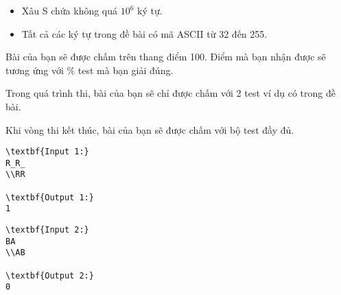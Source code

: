 \begin{itemize}
	\item     Xâu S chứa không quá $10^{6}$    ký tự.   
	\item     Tất cả các ký tự trong đề bài có mã ASCII từ 32 đến 255.   
\end{itemize}
Bài của bạn sẽ được chấm trên thang điểm 100. Điểm mà bạn nhận được sẽ tương ứng với \% test mà bạn giải đúng.  

   Trong quá trình thi, bài của bạn sẽ chỉ được chấm với 2 test ví dụ có trong đề bài.  

   Khi vòng thi kết thúc, bài của bạn sẽ được chấm với bộ test đầy đủ.
\begin{verbatim}
\textbf{Input 1:}
R_R_
\\RR

\textbf{Output 1:}
1
\end{verbatim}
\begin{verbatim}
\textbf{Input 2:}
BA
\\AB

\textbf{Output 2:}
0\end{verbatim}